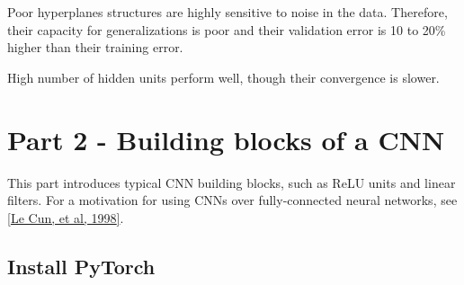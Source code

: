 \documentclass[11pt]{article}
\begin{document}
Poor hyperplanes structures are highly sensitive to noise in the data.
Therefore, their capacity for generalizations is poor and their
validation error is 10 to 20\% higher than their training error.

High number of hidden units perform well, though their convergence is
slower.

    \hypertarget{part-2---building-blocks-of-a-cnn}{%
\section{Part 2 - Building blocks of a
CNN}\label{part-2---building-blocks-of-a-cnn}}

This part introduces typical CNN building blocks, such as ReLU units and
linear filters. For a motivation for using CNNs over fully-connected
neural networks, see
\href{http://yann.lecun.com/exdb/publis/pdf/lecun-01a.pdf}{{[}Le Cun, et
al, 1998{]}}.

    \hypertarget{install-pytorch}{%
\subsection{Install PyTorch}\label{install-pytorch}}
\end{document}
